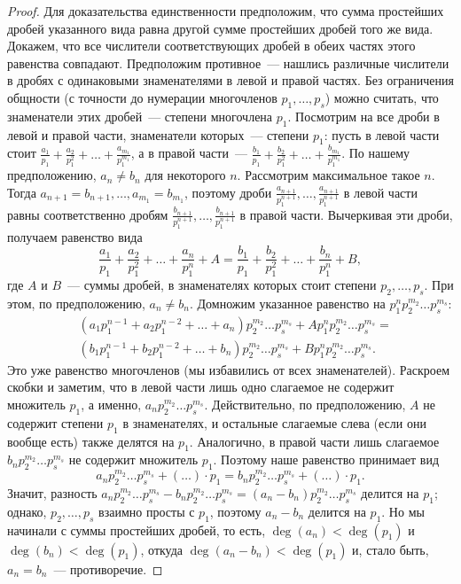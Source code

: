 \begin{proof}
Для доказательства единственности предположим, что сумма простейших
дробей указанного вида равна другой сумме простейших дробей того же
вида. Докажем, что все числители соответствующих дробей в обеих частях
этого равенства совпадают. Предположим противное~--- нашлись
различные числители в дробях с одинаковыми знаменателями в левой и
правой частях. Без ограничения общности (с точности до нумерации
многочленов $p_1,\dots,p_s$) можно считать, что знаменатели этих
дробей~--- степени многочлена $p_1$. Посмотрим на
все дроби в левой и правой части, знаменатели которых~--- степени
$p_1$: пусть в левой части стоит
$\frac{a_1}{p_1}+\frac{a_2}{p_1^2}+\dots+\frac{a_{m_1}}{p_1^{m_1}}$, а
в правой части~---
$\frac{b_1}{p_1}+\frac{b_2}{p_1^2}+\dots+\frac{b_{m_1}}{p_1^{m_1}}$. По
нашему предположению, $a_n\neq b_n$ для некоторого $n$. Рассмотрим
максимальное такое $n$. Тогда
$a_{n+1}=b_{n+1},\dots,a_{m_1}=b_{m_1}$, поэтому дроби
$\frac{a_{n+1}}{p_1^{n+1}},\dots,\frac{a_{n+1}}{p_1^{n+1}}$ в левой
части равны соответственно дробям
$\frac{b_{n+1}}{p_1^{n+1}},\dots,\frac{b_{n+1}}{p_1^{n+1}}$ в правой
части. Вычеркивая эти дроби, получаем равенство вида
$$
\frac{a_1}{p_1}+\frac{a_2}{p_1^2}+\dots+\frac{a_n}{p_1^n}+A=
\frac{b_1}{p_1}+\frac{b_2}{p_1^2}+\dots+\frac{b_n}{p_1^n}+B,
$$
где $A$ и $B$~--- суммы дробей, в знаменателях которых стоит
степени $p_2,\dots,p_s$. При этом, по предположению, $a_n\neq b_n$.
Домножим указанное равенство на $p_1^np_2^{m_2}\dots p_s^{m_s}$:
\begin{align*}
&(a_1p_1^{n-1}+a_2p_1^{n-2}+\dots+a_n)p_2^{m_2}\dots p_s^{m_s} +
Ap_1^np_2^{m_2}\dots p_s^{m_s} =\\ 
&(b_1p_1^{n-1}+b_2p_1^{n-2}+\dots+b_n)p_2^{m_2}\dots p_s^{m_s} +
Bp_1^np_2^{m_2}\dots p_s^{m_s}.
\end{align*}
Это уже равенство многочленов (мы избавились от всех знаменателей).
Раскроем скобки и заметим, что в левой части лишь одно слагаемое не
содержит множитель $p_1$, а именно, $a_np_2^{m_2}\dots
p_s^{m_s}$. Действительно, по предположению, $A$ не содержит
степени $p_1$ в знаменателях, и остальные слагаемые слева (если они
вообще есть) также делятся на $p_1$. Аналогично, в правой части лишь
слагаемое $b_np_2^{m_2}\dots p_s^{m_s}$ не содержит множитель
$p_1$. Поэтому наше равенство принимает вид
$$
a_np_2^{m_2}\dots p_s^{m_s}+(\dots)\cdot p_1 =
b_np_2^{m_2}\dots p_s^{m_s}+(\dots)\cdot p_1.
$$
Значит, разность $a_np_2^{m_2}\dots p_s^{m_s}-b_np_2^{m_2}\dots
p_s^{m_s}=(a_n-b_n)p_2^{m_2}\dots p_s^{m_s}$ делится на $p_1$; однако,
$p_2,\dots,p_s$ взаимно просты с $p_1$, поэтому $a_n-b_n$ делится на
$p_1$. Но мы начинали с суммы простейших дробей, то есть,
$\deg(a_n)<\deg(p_1)$ и $\deg(b_n)<\deg(p_1)$, откуда
$\deg(a_n-b_n)<\deg(p_1)$ и, стало быть, $a_n=b_n$~--- противоречие.
\end{proof}

